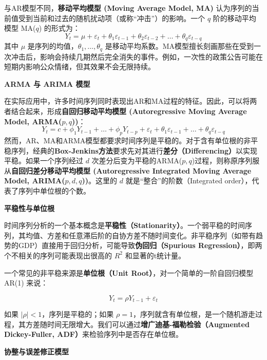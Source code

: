 与AR模型不同，\textbf{移动平均模型 (Moving Average Model, MA)} 认为序列的当前值受到当前和过去的随机扰动项（或称“冲击”）的影响。一个 $q$ 阶的移动平均模型 MA($q$) 的形式为：
\begin{equation}
	Y_t = \mu + \varepsilon_t + \theta_1 \varepsilon_{t-1} + \theta_2 \varepsilon_{t-2} + \dots + \theta_q \varepsilon_{t-q}
\end{equation}
其中 $\mu$ 是序列的均值，$\theta_1, \dots, \theta_q$ 是移动平均系数。MA模型擅长刻画那些在受到一次冲击后，影响会持续几期然后完全消失的事件。例如，一次性的政策公告可能在短期内影响公众情绪，但其效果不会无限持续。

\textbf{ARMA 与 ARIMA 模型}

在实际应用中，许多时间序列同时表现出AR和MA过程的特征。因此，可以将两者结合起来，形成\textbf{自回归移动平均模型 (Autoregressive Moving Average Model, ARMA($p,q$))}：
\begin{equation}
	Y_t = c + \phi_1 Y_{t-1} + \dots + \phi_p Y_{t-p} + \varepsilon_t + \theta_1 \varepsilon_{t-1} + \dots + \theta_q \varepsilon_{t-q}
\end{equation}
然而，AR、MA和ARMA模型都要求时间序列是平稳的。对于含有单位根的非平稳序列，经典的\textbf{Box-Jenkins方法}要求先对其进行\textbf{差分（Differencing）}以实现平稳。如果一个序列经过 $d$ 次差分后变为平稳的ARMA($p,q$)过程，则称原序列服从\textbf{自回归差分移动平均模型 (Autoregressive Integrated Moving Average Model, ARIMA($p,d,q$))}。这里的 $d$ 就是“整合”的阶数（Integrated order），代表了序列中单位根的个数。

\textbf{平稳性与单位根}

时间序列分析的一个基本概念是\textbf{平稳性（Stationarity）}。一个弱平稳的时间序列，其均值、方差和任意滞后阶的自协方差不随时间变化。非平稳序列（如带有趋势的GDP）直接用于回归分析，可能导致\textbf{伪回归（Spurious Regression）}，即两个不相关的序列可能表现出很高的 $R^2$ 和显著的t统计量。

一个常见的非平稳来源是\textbf{单位根（Unit Root）}，对一个简单的一阶自回归模型 AR(1) 来说：

\begin{equation}
	Y_t = \rho Y_{t-1} + \varepsilon_t
\end{equation}

如果 $|\rho|<1$，序列是平稳的；如果 $\rho=1$，序列就含有单位根，是一个随机游走过程，其方差随时间无限增大。我们可以通过\textbf{增广迪基-福勒检验（Augmented Dickey-Fuller, ADF）}来检验序列中是否存在单位根。

\textbf{协整与误差修正模型}

